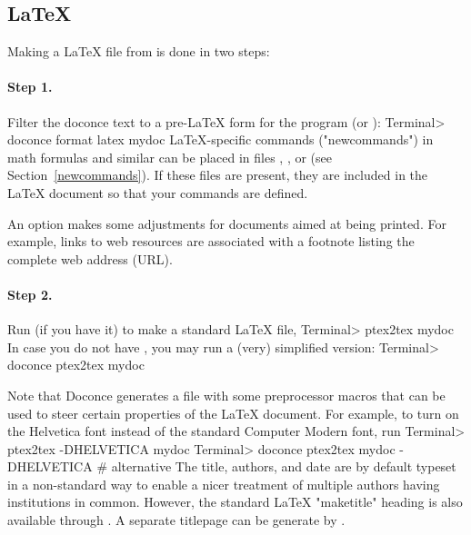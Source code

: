 \documentclass[%
oneside,                 %
final,                   %
chapterprefix=true,      %
open=right               %
10pt]{book}
\begin{document}
{{{\subsection{{\LaTeX}}

Making a {\LaTeX} file  from  is done in two steps:

\paragraph{Step 1.}
Filter the doconce text to a pre-LaTeX form  for
the  program (or ):
\bsys
Terminal> doconce format latex mydoc
\esys
LaTeX-specific commands ("newcommands") in math formulas and similar
can be placed in files , , or
 (see Section~\ref{newcommands}).
If these files are present, they are included in the {\LaTeX} document
so that your commands are defined.

An option  makes some adjustments for documents
aimed at being printed. For example, links to web resources are
associated with a footnote listing the complete web address (URL).

\paragraph{Step 2.}
Run  (if you have it) to make a standard {\LaTeX} file,
\bsys
Terminal> ptex2tex mydoc
\esys
In case you do not have , you may run a (very) simplified version:
\bsys
Terminal> doconce ptex2tex mydoc
\esys

Note that Doconce generates a  file with some preprocessor macros
that can be used to steer certain properties of the {\LaTeX} document.
For example, to turn on the Helvetica font instead of the standard
Computer Modern font, run
\bsys
Terminal> ptex2tex -DHELVETICA mydoc
Terminal> doconce ptex2tex mydoc -DHELVETICA  # alternative
\esys
The title, authors, and date are by default typeset in a non-standard
way to enable a nicer treatment of multiple authors having
institutions in common. However, the standard {\LaTeX} "maketitle" heading
is also available through .
A separate titlepage can be generate by
.

}}}
\end{document}
